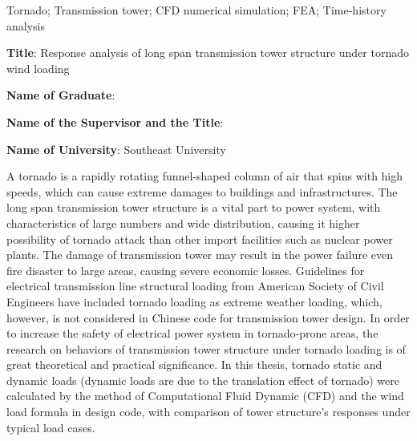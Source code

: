 \begin{abstract}{龙卷风；大跨越输电塔结构；CFD数值模拟；有限元分析；动力时程分析}
  最后，进行了输电塔结构在考虑龙卷风平移效应时的动态响应分析。
  选取龙卷风移动路径平行和垂直于输电线的两种典型工况，在任意时间步利用规范方法计算并施加龙卷风动态荷载，进行动力时程分析，并分析龙卷风动态荷载和结构典型响应的时程。
  结果表明，平行工况下龙卷风荷载总和时程沿输电线方向的分量出现持续时间约为\SI{10}{s}的波形（荷载先逐渐增大，后逐渐衰减），且荷载峰值较大，呈现出一定的冲击效应。
  垂直工况下龙卷风荷载总和时程沿垂直输电线方向的分量呈现类似的特点。
  且在两种工况下，输电塔塔顶节点位移时程与龙卷风荷载总和时程变化趋势相似。

\end{abstract}

\begin{englishabstract}{Tornado; Transmission tower; CFD numerical simulation; FEA; Time-history analysis }

  
  \noindent
  {\textbf {Title}: } Response analysis of long span transmission tower structure under tornado wind loading \par
  \noindent
  {\textbf {Name of Graduate}: } \par
  \noindent
  {\textbf {Name of the Supervisor and the Title}: } \par
  \noindent
  {\textbf {Name of University}: } Southeast University \par
  
  \bigskip
  

  A tornado is a rapidly rotating funnel-shaped column of air that spins with high speeds, which can cause extreme damages to buildings and infrastructures.
  The long span transmission tower structure is a vital part to power system, with characteristics of large numbers and wide distribution, causing it higher possibility of tornado attack than other import facilities such as nuclear power plants.
  The damage of transmission tower may result in the power failure even fire disaster to large areas, causing severe economic losses.
  Guidelines for electrical transmission line structural loading from American Society of Civil Engineers have included tornado loading as extreme weather loading, which, however, is not considered in Chinese code for transmission tower design.
  In order to increase the safety of electrical power system in tornado-prone areas, the research on behaviors of transmission tower structure under tornado loading is of great theoretical and practical significance.
  In this thesis, tornado static and dynamic loads (dynamic loads are due to the translation effect of tornado) were calculated by the method of Computational Fluid Dynamic (CFD) and the wind load formula in design code, with comparison of tower structure's responses under typical load cases.


\end{englishabstract}
